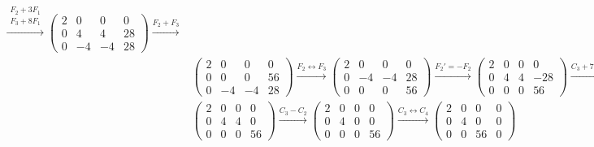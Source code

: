 \begin{ejemplo}
\begin{align*}
        \xrightarrow{\substack{F_2 + 3F_1\\F_3 + 8F_1}}
        \left(\begin{array}{cccc}
            2 & 0 & 0 & 0 \\
            0 & 4 & 4 & 28 \\
            0 & -4 & -4 & 28
        \end{array}\right)  
        \xrightarrow{F_2 + F_3} \\
        &\left(\begin{array}{cccc}
            2 & 0 & 0 & 0 \\
            0 & 0 & 0 & 56 \\
            0 & -4 & -4 & 28
        \end{array}\right) 
        \xrightarrow{F_2\leftrightarrow F_3}
        \left(\begin{array}{cccc}
            2 & 0 & 0 & 0 \\
            0 & -4 & -4 & 28 \\
            0 & 0 & 0 & 56 
        \end{array}\right)  
        \xrightarrow{F_2' = -F_2} 
        \left(\begin{array}{cccc}
            2 & 0 & 0 & 0 \\
            0 & 4 & 4 & -28 \\
            0 & 0 & 0 & 56 
        \end{array}\right)  
        \xrightarrow{C_3 + 7C_2} \\
        & \left(\begin{array}{cccc}
            2 & 0 & 0 & 0 \\
            0 & 4 & 4 & 0 \\
            0 & 0 & 0 & 56 
        \end{array}\right)   
        \xrightarrow{C_3 - C_2} 
        \left(\begin{array}{cccc}
            2 & 0 & 0 & 0 \\
            0 & 4 & 0 & 0 \\
            0 & 0 & 0 & 56 
        \end{array}\right)   
        \xrightarrow{C_3 \leftrightarrow C_4}
        \left(\begin{array}{cccc}
            2 & 0 & 0 & 0 \\
            0 & 4 & 0 & 0 \\
            0 & 0 & 56 & 0 
        \end{array}\right)   
    \end{align*}

\end{ejemplo}

